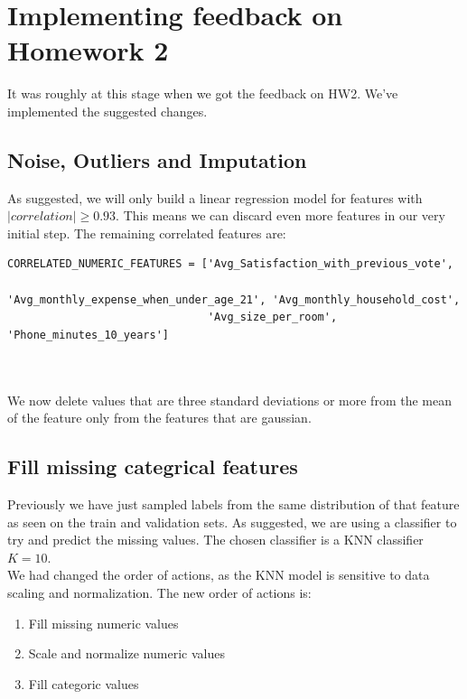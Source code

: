 \documentclass[12pt]{article}
\begin{document}
\section{Implementing feedback on Homework 2}
It was roughly at this stage when we got the feedback on HW2. We've implemented the suggested changes.
\subsection{Noise, Outliers and Imputation}
As suggested, we will only build a linear regression model for features with $|correlation| \geq  0.93$. This means we can discard even more features in our very initial step. The remaining correlated features are:\\

\begin{adjustbox}{max width=\linewidth}
\begin{lstlisting}
CORRELATED_NUMERIC_FEATURES = ['Avg_Satisfaction_with_previous_vote',
                               'Avg_monthly_expense_when_under_age_21', 'Avg_monthly_household_cost',
                               'Avg_size_per_room', 'Phone_minutes_10_years']
\end{lstlisting}
\end{adjustbox}\\
\\

We now delete values that are three standard deviations or more from the mean of the feature only from the features that are gaussian.

\subsection{Fill missing categrical features}
Previously we have just sampled labels from the same distribution of that feature as seen on the train and validation sets. As suggested, we are using a classifier to try and predict the missing values. The chosen classifier is a KNN classifier $K=10$.\\
We had changed the order of actions, as the KNN model is sensitive to data scaling and normalization. The new order of actions is:
\begin{enumerate}
\item Fill missing numeric values
\item Scale and normalize numeric values
\item Fill categoric values
\end{enumerate}
\end{document}

